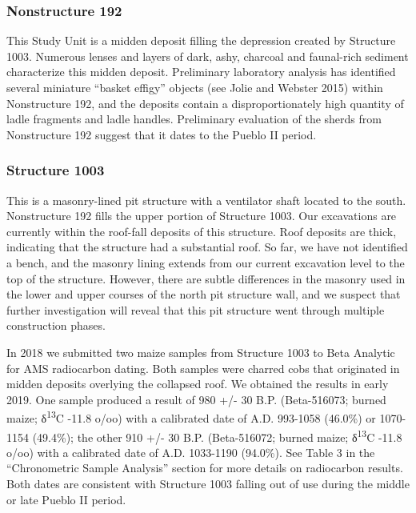 \documentclass[
  12pt,
]{krantz}
\begin{document}
\hypertarget{nonstructure-192}{%
\subsubsection{Nonstructure 192}\label{nonstructure-192}}

This Study Unit is a midden deposit filling the depression created by
Structure 1003. Numerous lenses and layers of dark, ashy, charcoal and
faunal-rich sediment characterize this midden deposit. Preliminary
laboratory analysis has identified several miniature ``basket effigy''
objects (see Jolie and Webster 2015) within Nonstructure 192, and the
deposits contain a disproportionately high quantity of ladle fragments
and ladle handles. Preliminary evaluation of the sherds from
Nonstructure 192 suggest that it dates to the Pueblo II period.

\hypertarget{structure-1003}{%
\subsubsection{Structure 1003}\label{structure-1003}}

This is a masonry-lined pit structure with a ventilator shaft located to
the south. Nonstructure 192 fills the upper portion of Structure 1003.
Our excavations are currently within the roof-fall deposits of this
structure. Roof deposits are thick, indicating that the structure had a
substantial roof. So far, we have not identified a bench, and the
masonry lining extends from our current excavation level to the top of
the structure. However, there are subtle differences in the masonry used
in the lower and upper courses of the north pit structure wall, and we
suspect that further investigation will reveal that this pit structure
went through multiple construction phases.

In 2018 we submitted two maize samples from Structure 1003 to Beta
Analytic for AMS radiocarbon dating. Both samples were charred cobs that
originated in midden deposits overlying the collapsed roof. We obtained
the results in early 2019. One sample produced a result of 980 +/- 30
B.P. (Beta-516073; burned maize; δ\textsuperscript{13}C -11.8 o/oo) with a calibrated
date of A.D. 993-1058 (46.0\%) or 1070-1154 (49.4\%); the other 910 +/- 30
B.P. (Beta-516072; burned maize; δ\textsuperscript{13}C -11.8 o/oo) with a calibrated
date of A.D. 1033-1190 (94.0\%). See Table 3 in the ``Chronometric Sample
Analysis'' section for more details on radiocarbon results. Both dates
are consistent with Structure 1003 falling out of use during the middle
or late Pueblo II period.
\end{document}
